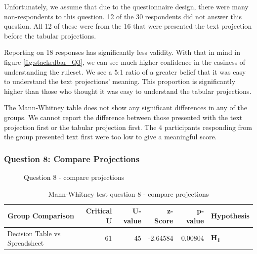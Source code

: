Unfortunately, we assume that due to the questionnaire design, there were many non-respondents to this question. 
12 of the 30 respondents did not answer this question.
All 12 of these were from the 16 that were presented the text projection before the tabular projections.

Reporting on 18 responses has significantly less validity.
With that in mind in figure \ref{fig:stackedbar_Q3}, we can see much higher confidence in the easiness of understanding the ruleset.
We see a 5:1 ratio of a greater belief that it was easy to understand the text projections' meaning.
This proportion is significantly higher than those who thought it was easy to understand the tabular projections.

The Mann-Whitney table does not show any significant differences in any of the groups.
We cannot report the difference between those presented with the text projection first or the tabular projection first.
The 4 participants responding from the group presented text first were too low to give a meaningful score.

\pagebreak
\subsubsection{Question 8: Compare Projections}

\begin{figure}
    \centering
    \caption{Question 8 - compare projections}
    \label{fig:stackedbar_Q4}
\end{figure}

\begin{table}
    \begin{center}
        \begin{tabular}{ |l ||r |r |r | r|l | } 
            \hline
            Group Comparison                 & Critical U & U-value & z-Score  & p-value & Hypothesis         \\
            \hline
            \hline
            Decision Table vs Spreadsheet    & 61         & 45      &  -2.64584& 0.00804 & \textbf{H\textsubscript{1}} \\ 
            \hline
        \end{tabular}
    \end{center}
    \caption{Mann-Whitney test question 8 - compare projections}
    \label{table:mannwhitneyQ4}
\end{table}

